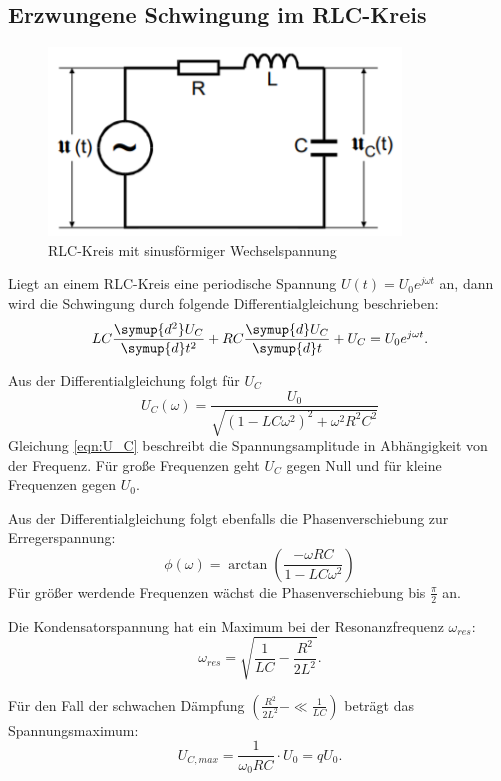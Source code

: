 \subsection{Erzwungene Schwingung im RLC-Kreis}
\begin{figure}[H]
  \centering
  \includegraphics[height=5cm]{wechselspannung.PNG}
  \caption{RLC-Kreis mit sinusförmiger Wechselspannung}
  \label{fig:wechselspannung}
\end{figure}

Liegt an einem RLC-Kreis eine periodische Spannung $U(t) = U_0 e^{j\omega t}$ an, dann wird die Schwingung durch folgende
Differentialgleichung beschrieben:
\begin{align}
  LC\frac{\symup{d^2}U_C}{\symup{d}t^2} + RC\frac{\symup{d}U_C}{\symup{d}t} + U_C = U_0 e^{j\omega t}.
\end{align}

Aus der Differentialgleichung folgt für $U_C$
\begin{equation}
  U_C(\omega) = \frac{U_0}{\sqrt{\left(1-LC\omega^2 \right)^2 + \omega^2 R^2 C^2}} \label{eqn:U_C}
\end{equation}
Gleichung \eqref{eqn:U_C} beschreibt die Spannungsamplitude in Abhängigkeit von der Frequenz. Für große Frequenzen
geht $U_C$ gegen Null und für kleine Frequenzen gegen $U_0$.

Aus der Differentialgleichung folgt ebenfalls die Phasenverschiebung zur Erregerspannung:
\begin{equation}
  \phi (\omega) = \arctan{\left(\frac{-\omega R C}{1 - LC \omega^2}\right)}
\end{equation}
Für größer werdende Frequenzen wächst die Phasenverschiebung bis $\frac{\pi}{2}$ an.

Die Kondensatorspannung hat ein Maximum bei der Resonanzfrequenz $\omega_{res}$:
\begin{equation}
  \omega_{res} = \sqrt{\frac{1}{LC} - \frac{R^2}{2L^2}}.
\end{equation}

Für den Fall der schwachen Dämpfung $\left(\frac{R^2}{2L^2} - \ll \frac{1}{LC}\right)$ beträgt das
Spannungsmaximum:
\begin{equation}
  U_{C,max} = \frac{1}{\omega_0 RC} \cdot U_0 = qU_0.
\end{equation}


